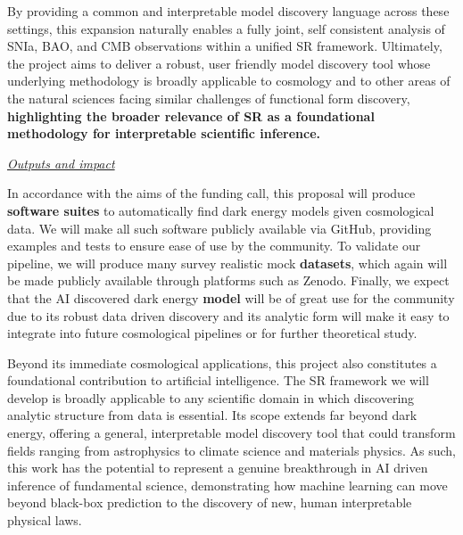 \documentclass[11pt]{article}
\newcommand{\db}[1]{{\color{purple}[DJB: #1]}}
\newcommand{\am}[1]{{\color{olive}[AM: #1]}}
\begin{document}
By providing a common and interpretable model discovery language across these settings, this expansion naturally enables a fully joint, self consistent analysis of SNIa, BAO, and CMB observations within a unified SR framework. Ultimately, the project aims to deliver a robust, user friendly model discovery tool whose underlying methodology is broadly applicable to cosmology and to other areas of the natural sciences facing similar challenges of functional form discovery,  \textbf{highlighting the broader relevance of SR as a foundational methodology for interpretable scientific inference.}





\underline{\textit{Outputs and impact}}

In accordance with the aims of the funding call, this proposal will produce \textbf{software suites} to automatically find dark energy models given cosmological data. We will make all such software publicly available via GitHub, providing examples and tests to ensure ease of use by the community.
To validate our pipeline, we will produce many survey realistic mock \textbf{datasets}, which again will be made publicly available through platforms such as Zenodo. 
Finally, we expect that the AI discovered dark energy \textbf{model} will be of great use for the community due to its robust data driven discovery and its analytic form will make it easy to integrate into future cosmological pipelines or for further theoretical  study.

Beyond its immediate cosmological applications, this project also constitutes a foundational contribution to artificial intelligence. The SR framework we will develop is broadly applicable to any scientific domain in which discovering analytic structure from data is essential. Its scope extends far beyond dark energy, offering a general, interpretable model discovery tool that could transform fields ranging from astrophysics to climate science and materials physics. As such, this work has the potential to represent a genuine breakthrough in AI driven  inference of fundamental science, demonstrating how machine learning can move beyond black-box prediction to the discovery of new, human interpretable physical laws.

\end{document}
